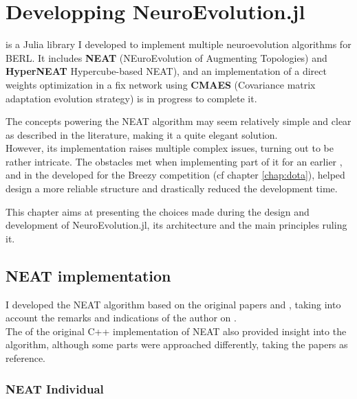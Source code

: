 \chapter{Developping NeuroEvolution.jl}
\label{chap:neuroevo}

\href{https://github.com/TemplierPaul/NeuroEvolution.jl}{\color{blue}{NeuroEvolution.jl}} is a Julia library I developed to implement multiple neuroevolution algorithms for BERL. It includes \textbf{NEAT} (NEuroEvolution of Augmenting Topologies) and \textbf{HyperNEAT} Hypercube-based NEAT), and an implementation of a direct weights optimization in a fix network using \textbf{CMAES} (Covariance matrix adaptation evolution strategy) is in progress to complete it. 

The concepts powering the NEAT algorithm may seem relatively simple and clear as described in the literature, making it a quite elegant solution. \\
However, its implementation raises multiple complex issues, turning out to be rather intricate. The obstacles met when implementing part of it for an earlier \href{https://github.com/TemplierPaul/Genepy}{\color{blue}{personal project}},  and in the \href{https://github.com/d9w/NEAT.jl/tree/master/src}{\color{blue}{NEAT agent}} developed for the Breezy competition (cf chapter \ref{chap:dota}), helped design a more reliable structure and drastically reduced the development time.

This chapter aims at presenting the choices made during the design and development of NeuroEvolution.jl, its architecture and the main principles ruling it. 

\section{NEAT implementation}
I developed the NEAT algorithm based on the original papers \cite{NEAT_1} and \cite{NEAT_2}, taking into account the remarks and indications of the author on \href{https://www.cs.ucf.edu/~kstanley/neat.html#FAQ2}{
\color{blue}{his website}}. \\
The \href{https://github.com/FernandoTorres/NEAT}{\color{blue}{reorganized version}} of the original C++ implementation of NEAT also provided insight into the algorithm, although some parts were approached differently, taking the papers as reference.

\subsection{NEAT Individual}

